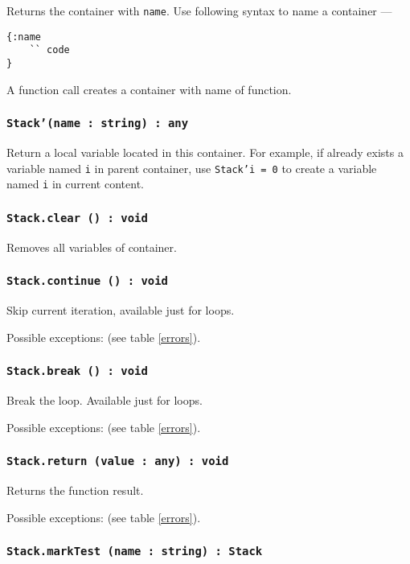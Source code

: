 Returns the container with \texttt{name}. Use following syntax to name a container —
\begin{verbatim}
{:name
	`` code
}
\end{verbatim}
A function call creates a container with name of function.


\subsubsection{\texttt{Stack'(name : string) : any}}

Return a local variable located in this container. For example, if already exists a variable named \texttt{i} in parent container, use \texttt{Stack'i = 0} to create a variable named \texttt{i} in current content.

\subsubsection{\texttt{Stack.clear () : void}}

Removes all variables of container.

\subsubsection{\texttt{Stack.continue () : void}}

Skip current iteration, available just for loops.

Possible exceptions:  (see table \ref{errors}).

\subsubsection{\texttt{Stack.break () : void}}

Break the loop. Available just for loops.

Possible exceptions:  (see table \ref{errors}).

\subsubsection{\texttt{Stack.return (value : any) : void}}

Returns the function result.

Possible exceptions:  (see table \ref{errors}).

\subsubsection{\texttt{Stack.markTest (name : string) : Stack}}

